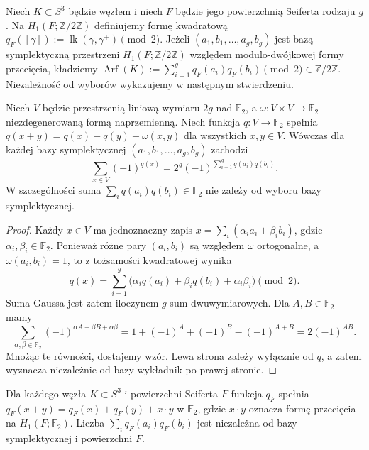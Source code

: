 \begin{definicja}
Niech $K\subset S^3$ będzie węzłem i niech
$F$ będzie jego powierzchnią Seiferta rodzaju $g$.
Na $H_1(F;\mathbb Z/2\mathbb Z)$ definiujemy
formę kwadratową $q_F([\gamma]):=
\operatorname{lk}(\gamma,\gamma^+)\pmod2$.
Jeżeli $(a_1,b_1,\dots,a_g,b_g)$ jest bazą symplektyczną
przestrzeni $H_1(F;\mathbb Z/2\mathbb Z)$ względem
modulo-dwójkowej formy przecięcia, kładziemy
$\operatorname{Arf}(K):=\sum_{i=1}^{g}q_F(a_i)q_F(b_i)
\pmod2\in\mathbb Z/2\mathbb Z$.
Niezależność od wyborów wykazujemy w następnym stwierdzeniu.
\end{definicja}

\begin{lemat}
\label{lem:tg-arf-gauss}
Niech $V$ będzie przestrzenią liniową wymiaru $2g$ nad
$\mathbb F_2$, a $\omega\colon V\times V\to\mathbb F_2$
niezdegenerowaną formą naprzemienną. Niech funkcja
$q\colon V\to\mathbb F_2$ spełnia
$q(x+y)=q(x)+q(y)+\omega(x,y)$ dla wszystkich $x,y\in V$.
Wówczas dla każdej bazy symplektycznej
$(a_1,b_1,\ldots,a_g,b_g)$ zachodzi
\[
\sum_{x\in V}(-1)^{q(x)}
=2^g(-1)^{\sum_{i=1}^g q(a_i)q(b_i)}.
\]
W szczególności suma $\sum_iq(a_i)q(b_i)\in\mathbb F_2$
nie zależy od wyboru bazy symplektycznej.
\end{lemat}

\begin{proof}
Każdy $x\in V$ ma jednoznaczny zapis
$x=\sum_i(\alpha_i a_i+\beta_i b_i)$, gdzie
$\alpha_i,\beta_i\in\mathbb F_2$. Ponieważ różne pary
$(a_i,b_i)$ są względem $\omega$ ortogonalne, a
$\omega(a_i,b_i)=1$, to z tożsamości kwadratowej wynika
\[
q(x)=\sum_{i=1}^g
\bigl(\alpha_i q(a_i)+\beta_i q(b_i)+\alpha_i\beta_i\bigr)
\pmod 2.
\]
Suma Gaussa jest zatem iloczynem $g$ sum dwuwymiarowych.
Dla $A,B\in\mathbb F_2$ mamy
\[
\sum_{\alpha,\beta\in\mathbb F_2}
(-1)^{\alpha A+\beta B+\alpha\beta}
=1+(-1)^A+(-1)^B-(-1)^{A+B}
=2(-1)^{AB}.
\]
Mnożąc te równości, dostajemy wzór. Lewa strona zależy
wyłącznie od $q$, a zatem wyznacza niezależnie od bazy
wykładnik po prawej stronie.
\end{proof}

\begin{stwierdzenie}
Dla każdego węzła $K\subset S^3$ i powierzchni Seiferta
$F$ funkcja $q_F$ spełnia
$q_F(x+y)=q_F(x)+q_F(y)+x\cdot y$ w $\mathbb F_2$,
gdzie $x\cdot y$ oznacza formę przecięcia na $H_1(F;\mathbb F_2)$.
Liczba $\sum_iq_F(a_i)q_F(b_i)$ jest niezależna od bazy
symplektycznej i powierzchni $F$.
\end{stwierdzenie}

